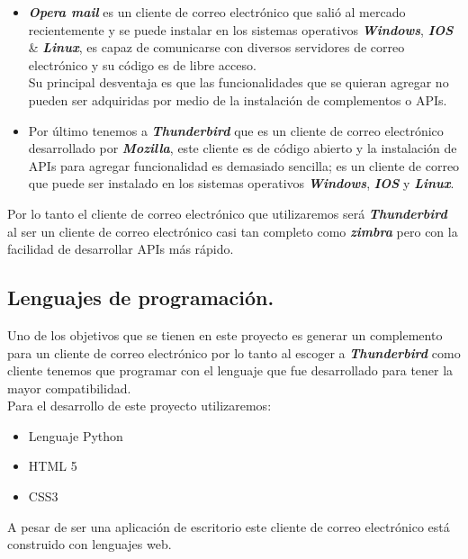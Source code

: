 \documentclass[12pt,oneside,onecolumn,openany]{report}
\begin{document}
\begin{itemize}
 \item \textbf{\textit{Opera mail}} es un cliente de correo electrónico que salió al mercado recientemente y se puede instalar en los sistemas operativos \textbf{\textit{Windows}}, \textbf{\textit{IOS}} \& \textbf{\textit{Linux}}, es capaz de comunicarse con diversos servidores de correo electrónico y su código es de libre acceso.\\Su principal desventaja es que las funcionalidades que se quieran agregar no pueden ser adquiridas por medio de la instalación de complementos o APIs.\cite{opera}
 \item Por último tenemos a \textbf{\textit{Thunderbird}} que es un cliente de correo electrónico desarrollado por \textbf{\textit{Mozilla}}, este cliente es de código abierto y la instalación de APIs para agregar funcionalidad es demasiado sencilla; es un cliente de correo que puede ser instalado en los sistemas operativos \textbf{\textit{Windows}}, \textbf{\textit{IOS}} y \textbf{\textit{Linux}}.\cite{thun}
\end{itemize}
Por lo tanto el cliente de correo electrónico que utilizaremos será \textbf{\textit{Thunderbird}} al ser un cliente de correo electrónico casi tan completo como \textbf{\textit{zimbra}} pero con la facilidad de desarrollar APIs más rápido.\\
\subsection{Lenguajes de programación.}
Uno de los objetivos que se tienen en este proyecto es generar un complemento para un cliente de correo electrónico por lo tanto al escoger a \textbf{\textit{Thunderbird}} como cliente tenemos que programar con el lenguaje que fue desarrollado para tener la mayor compatibilidad.\\Para el desarrollo de este proyecto utilizaremos\cite{thun}:
\begin{itemize}
 \item Lenguaje Python
 \item HTML 5
 \item CSS3
\end{itemize}
A pesar de ser una aplicación de escritorio este cliente de correo electrónico está construido con lenguajes web.
\end{document}
